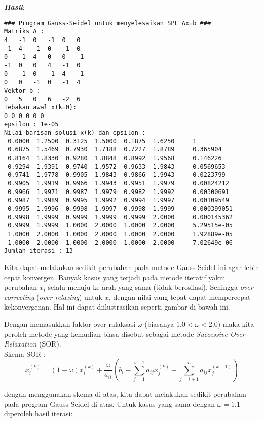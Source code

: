 \documentclass[paper=a4, fontsize=11pt]{scrartcl}
\numberwithin{equation}{section} %
\numberwithin{figure}{section} %
\numberwithin{table}{section} %
\begin{document}
\textit{\textbf{Hasil}}:
\begin{small}
\begin{verbatim}
### Program Gauss-Seidel untuk menyelesaikan SPL Ax=b ###
Matriks A : 
4	-1	0	-1	0	0	
-1	4	-1	0	-1	0	
0	-1	4	0	0	-1	
-1	0	0	4	-1	0	
0	-1	0	-1	4	-1	
0	0	-1	0	-1	4	
Vektor b : 
0	5	0	6	-2	6	
Tebakan awal x(k=0): 
0 0 0 0 0 0 
epsilon : 1e-05
Nilai barisan solusi x(k) dan epsilon : 
 0.0000  1.2500  0.3125  1.5000  0.1875  1.6250 	1
 0.6875  1.5469  0.7930  1.7188  0.7227  1.8789 	0.365904
 0.8164  1.8330  0.9280  1.8848  0.8992  1.9568 	0.146226
 0.9294  1.9391  0.9740  1.9572  0.9633  1.9843 	0.0569653
 0.9741  1.9778  0.9905  1.9843  0.9866  1.9943 	0.0223799
 0.9905  1.9919  0.9966  1.9943  0.9951  1.9979 	0.00824212
 0.9966  1.9971  0.9987  1.9979  0.9982  1.9992 	0.00300691
 0.9987  1.9989  0.9995  1.9992  0.9994  1.9997 	0.00109549
 0.9995  1.9996  0.9998  1.9997  0.9998  1.9999 	0.000399051
 0.9998  1.9999  0.9999  1.9999  0.9999  2.0000 	0.000145362
 0.9999  1.9999  1.0000  2.0000  1.0000  2.0000 	5.29515e-05
 1.0000  2.0000  1.0000  2.0000  1.0000  2.0000 	1.92889e-05
 1.0000  2.0000  1.0000  2.0000  1.0000  2.0000 	7.02649e-06
Jumlah iterasi : 13
\end{verbatim}
\end{small}

\vspace{1cm}
Kita dapat melakukan sedikit perubahan pada metode Gauss-Seidel ini agar lebih cepat konvergen. Banyak kasus yang terjadi pada metode iteratif yakni perubahan $x_{i}$ selalu menuju ke arah yang sama (tidak berosilasi). Sehingga \textit{over-correcting} (\textit{over-relaxing}) untuk $x_{i}$ dengan nilai yang tepat dapat mempercepat kekonvergenan. Hal ini dapat diilustrasikan seperti gambar di bawah ini.


Dengan memasukkan faktor over-ralaksasi $\omega $ (biasanya $1.0<\omega<2.0$) maka kita peroleh metode yang kemudian biasa disebut sebagai metode \textit{Successive Over-Relaxation} (SOR).\\
Skema SOR :
\begin{equation}
x_{i}^{(k)} = (1 - \omega)x_{i}^{(k)} + \frac{\omega}{a_{ii}}\left(b_{i} -\sum_{j=1}^{i-1}a_{ij}x_{j}^{(k)} -\sum_{j=i+1}^{n}a_{ij}x_{j}^{(k-1)}\right)
\end{equation}

dengan menggunakan skema di atas, kita dapat melakukan sedikit perubahan pada program Gauss-Seidel di atas. Untuk kasus yang sama dengan $\omega = 1.1$ diperoleh hasil iterasi:
\end{document}
